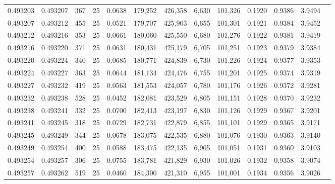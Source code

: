 \begin{tabular}{rrrrrrrrrrrrr}
0.493203 & 0.493207 &   367 &  25 &                                     0.0638 & 179,252 & 426,358 &   6,630 & 101,326 & 0.1920 & 0.9386 & 3.9494 \\
0.493207 & 0.493212 &   455 &  25 &                                     0.0521 & 179,707 & 425,903 &   6,655 & 101,301 & 0.1921 & 0.9384 & 3.9452 \\
0.493212 & 0.493216 &   353 &  25 &                                     0.0661 & 180,060 & 425,550 &   6,680 & 101,276 & 0.1922 & 0.9381 & 3.9419 \\
0.493216 & 0.493220 &   371 &  25 &                                     0.0631 & 180,431 & 425,179 &   6,705 & 101,251 & 0.1923 & 0.9379 & 3.9384 \\
0.493220 & 0.493224 &   340 &  25 &                                     0.0685 & 180,771 & 424,839 &   6,730 & 101,226 & 0.1924 & 0.9377 & 3.9353 \\
0.493224 & 0.493227 &   363 &  25 &                                     0.0644 & 181,134 & 424,476 &   6,755 & 101,201 & 0.1925 & 0.9374 & 3.9319 \\
0.493227 & 0.493232 &   419 &  25 &                                     0.0563 & 181,553 & 424,057 &   6,780 & 101,176 & 0.1926 & 0.9372 & 3.9281 \\
0.493232 & 0.493238 &   528 &  25 &                                     0.0452 & 182,081 & 423,529 &   6,805 & 101,151 & 0.1928 & 0.9370 & 3.9232 \\
0.493238 & 0.493241 &   332 &  25 &                                     0.0700 & 182,413 & 423,197 &   6,830 & 101,126 & 0.1929 & 0.9367 & 3.9201 \\
0.493241 & 0.493245 &   318 &  25 &                                     0.0729 & 182,731 & 422,879 &   6,855 & 101,101 & 0.1929 & 0.9365 & 3.9171 \\
0.493245 & 0.493249 &   344 &  25 &                                     0.0678 & 183,075 & 422,535 &   6,880 & 101,076 & 0.1930 & 0.9363 & 3.9140 \\
0.493249 & 0.493254 &   400 &  25 &                                     0.0588 & 183,475 & 422,135 &   6,905 & 101,051 & 0.1931 & 0.9360 & 3.9103 \\
0.493254 & 0.493257 &   306 &  25 &                                     0.0755 & 183,781 & 421,829 &   6,930 & 101,026 & 0.1932 & 0.9358 & 3.9074 \\
0.493257 & 0.493262 &   519 &  25 &                                     0.0460 & 184,300 & 421,310 &   6,955 & 101,001 & 0.1934 & 0.9356 & 3.9026 \\

\end{tabular}
